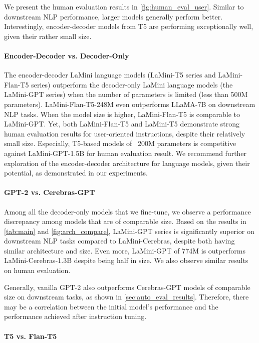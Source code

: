 \documentclass[11pt]{article}
\newcommand{\modelname}{LaMini\xspace}
\begin{document}
We present the human evaluation results in \autoref{fig:human_eval_user}. Similar to downstream NLP performance, larger models generally perform better. Interestingly, encoder-decoder models from T5 are performing exceptionally well, given their rather small size.

\paragraph{Encoder-Decoder vs. Decoder-Only}


The encoder-decoder \modelname language models (\modelname-T5 series and \modelname-Flan-T5 series) outperform the decoder-only \modelname language models (the \modelname-GPT series) when the number of parameters is limited (less than 500M parameters). \modelname-Flan-T5-248M even outperforms LLaMA-7B on downstream NLP tasks. When the model size is higher, \modelname-Flan-T5 is comparable to \modelname-GPT. Yet, both \modelname-Flan-T5 and \modelname-T5 demonstrate strong human evaluation results for user-oriented instructions, despite their relatively small size. Especially, T5-based models of ~200M parameters is competitive against \modelname-GPT-1.5B for human evaluation result. We recommend further exploration of the encoder-decoder architecture for language models, given their potential, as demonstrated in our experiments.


\paragraph{GPT-2 vs. Cerebras-GPT} 

Among all the decoder-only models that we fine-tune, we observe a performance discrepancy among models that are of comparable size. Based on the results in \autoref{tab:main} and \autoref{fig:arch_compare}, \modelname-GPT series is significantly superior on downstream NLP tasks compared to \modelname-Cerebras, despite both having similar architecture and size. Even more, \modelname-GPT of 774M is outperforms \modelname-Cerebras-1.3B despite being half in size. We also observe similar results on human evaluation. 

Generally, vanilla GPT-2 also outperforms Cerebras-GPT models of comparable size on downstream tasks, as shown in \autoref{sec:auto_eval_results}. Therefore, there may be a correlation between the initial model's performance and the performance achieved after instruction tuning. 


\paragraph{T5 vs. Flan-T5}
\end{document}
